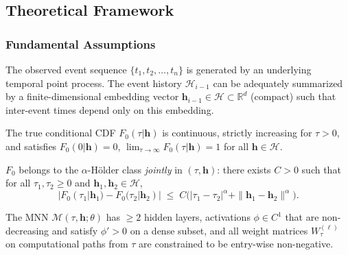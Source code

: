 
\subsection{Theoretical Framework}

\subsubsection{Fundamental Assumptions}

\begin{assumption}
\label{assumption:foundation}
The observed event sequence $\{t_1, t_2, \ldots, t_n\}$ is generated by an underlying
temporal point process. The event history $\mathcal{H}_{i-1}$ can be adequately
summarized by a finite-dimensional embedding vector $\boldsymbol{h}_{i-1} \in \mathcal{H}
\subset \mathbb{R}^d$ (compact) such that inter-event times depend only on this embedding.
\end{assumption}

\begin{assumption}
\label{assumption:regularity}
The true conditional CDF $F_0(\tau|\boldsymbol{h})$ is continuous, strictly increasing
for $\tau > 0$, and satisfies $F_0(0|\boldsymbol{h}) = 0$,
$\lim_{\tau \to \infty} F_0(\tau|\boldsymbol{h}) = 1$ for all $\boldsymbol{h} \in \mathcal{H}$.
\end{assumption}

\begin{assumption}
\label{assumption:smoothness}
$F_0$ belongs to the $\alpha$-Hölder class \emph{jointly} in $(\tau, \boldsymbol{h})$:
there exists $C > 0$ such that for all $\tau_1, \tau_2 \geq 0$ and
$\boldsymbol{h}_1, \boldsymbol{h}_2 \in \mathcal{H}$,
\[
|F_0(\tau_1|\boldsymbol{h}_1) - F_0(\tau_2|\boldsymbol{h}_2)|
\;\leq\; C\bigl(|\tau_1-\tau_2|^\alpha + \|\boldsymbol{h}_1 - \boldsymbol{h}_2\|^\alpha\bigr).
\]
\end{assumption}

\begin{assumption}
\label{assumption:architecture}
The MNN $\mathcal{M}(\tau, \boldsymbol{h}; \theta)$ has $\geq 2$ hidden layers,
activations $\phi \in C^1$ that are non-decreasing and satisfy
$\phi' > 0$ on a dense subset, and all weight matrices $W^{(\ell)}_\tau$
on computational paths from $\tau$ are constrained to be entry-wise non-negative.
\end{assumption}

